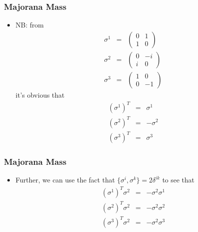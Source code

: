 \documentclass{beamer}
\begin{document}
 









 
\begin{frame}
	\frametitle{Majorana Mass}
		\begin{itemize}
		\item NB: from
\[
\begin{aligned}\sigma^{1} & = & \left(\begin{array}{cc}
0 & 1\\
1 & 0
\end{array}\right)\\
\sigma^{2} & = & \left(\begin{array}{cc}
0 & -i\\
i & 0
\end{array}\right)\\
\sigma^{3} & = & \left(\begin{array}{cc}
1 & 0\\
0 & -1
\end{array}\right)
\end{aligned}
\]
\pause
it's obvious that
\pause
\[
\begin{alignedat}{2}\left(\sigma^{1}\right)^{T} & = & \sigma^{1}\\
\left(\sigma^{2}\right)^{T} & = & -\sigma^{2}\\
\left(\sigma^{3}\right)^{T} & = & \sigma^{3}
\end{alignedat}
\]

	\end{itemize}
\end{frame}

 











 
\begin{frame}
	\frametitle{Majorana Mass}
		\begin{itemize}
			\item 
Further, we can use the fact that $\{\sigma^{i},\sigma^{k}\}=2\delta^{ik}$ to see that 
\pause
\[
\begin{alignedat}{2}\left(\sigma^{1}\right)^{T}\sigma^{2} & = & -\sigma^{2}\sigma^{1}\\
\left(\sigma^{2}\right)^{T}\sigma^{2} & = & -\sigma^{2}\sigma^{2}\\
\left(\sigma^{3}\right)^{T}\sigma^{2} & = & -\sigma^{2}\sigma^{3}
\end{alignedat}
\]

	\end{itemize}
\end{frame}
\end{document}
